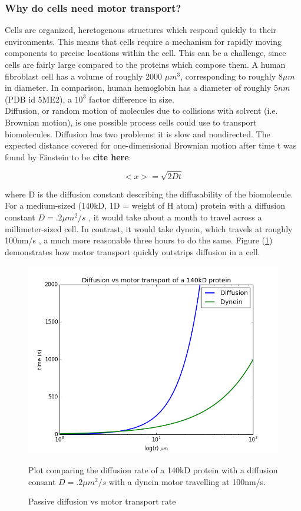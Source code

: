 \documentclass[10pt]{article} %
\begin{document}
\subsubsection{Why do cells need motor transport?}
Cells are organized, heretogenous structures which respond quickly to their environments. This means that cells require a mechanism for rapidly moving components to precise locations within the cell. This can be a challenge, since cells are fairly large compared to the proteins which compose them. A human fibroblast cell has a volume of roughly 2000 $\mu m^3$\cite{fibroblastvolume}, corresponding to roughly $8 \mu m$ in diameter. In comparison, human hemoglobin has a diameter of roughly $5 nm$ (PDB id 5ME2), a $10^3$ factor difference in size.\\

Diffusion, or random motion of molecules due to collisions with solvent (i.e. Brownian motion), is one possible process cells could use to transport biomolecules. Diffusion has two problems: it is slow and nondirected. The expected distance covered for one-dimensional Brownian motion after time t was found by Einstein to be \textbf{cite here}:

\begin{equation}
  \label{diffusion-equation}
  <x> = \sqrt{2Dt}
\end{equation}

where D is the diffusion constant describing the diffusability of the biomolecule. For a medium-sized (140kD, 1D = weight of H atom) protein with a diffusion constant $D = .2 \mu m^2/s$ \cite{diffusionconstants}, it would take about a month to travel across a millimeter-sized cell. In contrast, it would take dynein, which travels at roughly 100nm/s \cite{weihongpaper}, a much more reasonable three hours to do the same. Figure (\ref{fig:diffusion_vs_dynein}) demonstrates how motor transport quickly outstrips diffusion in a cell.\\

\begin{figure}[h]
  \centering
  \includegraphics[width=.65\textwidth,keepaspectratio]{../../figures/diffusion_vs_dynein.png}
  \caption{Passive diffusion vs motor transport rate}{Plot comparing the diffusion rate of a 140kD protein with a diffusion consant $D = .2 \mu m^2/s$ with a dynein motor travelling at 100nm/s.}
  \label{fig:diffusion_vs_dynein}
\end{figure}
\end{document}
